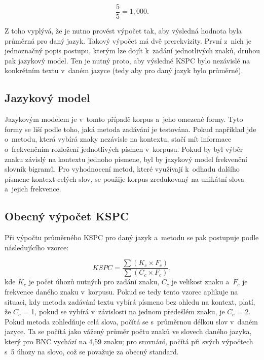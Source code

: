 \documentclass[a4paper,11pt,openany]{book} %
\begin{document}
\[
	\frac{5}{5} = 1,000.
\]

Z toho vyplývá, že je nutno provést výpočet tak, aby výsledná hodnota byla průměrná pro daný jazyk. Takový výpočet má dvě prerekvizity. První z~nich je jednoznačný popis postupu, kterým lze dojít k~zadání jednotlivých znaků, druhou pak jazykový model. Ten je nutný proto, aby výsledné KSPC bylo nezávislé na konkrétním textu v~daném jazyce (tedy aby pro daný jazyk bylo průměrné). \parencite[196]{mackenzie2002kspc}

\subsection{Jazykový model}

Jazykovým modelem je v~tomto případě korpus a~jeho omezené formy. Tyto formy se liší podle toho, jaká metoda zadávání je testována. Pokud například jde o~metodu, která vybírá znaky nezávisle na kontextu, stačí mít informace o~frekvenčním rozložení jednotlivých písmen v~korpusu. Pokud by byl výběr znaku závislý na kontextu jednoho písmene, byl by jazykový model frekvenční slovník bigramů. Pro vyhodnocení metod, které využívají k~odhadu dalšího písmene kontext celých slov, se použije korpus zredukovaný na unikátní slova a~jejich frekvence.  \parencite[197]{mackenzie2002kspc} %

\subsection{Obecný výpočet KSPC}

Při výpočtu průměrného KSPC pro daný jazyk a~metodu se pak postupuje podle následujícího vzorce:

\[
	KSPC = \frac{\sum{ (K_c \times F_c) }}{\sum{ (C_c \times F_c) }},
\]
kde $K_c$ je počet úhozů nutných pro zadání znaku, $C_c$ je velikost znaku a~$F_c$ je frekvence daného znaku v~korpusu. Pokud se tedy tento vzorec aplikuje na situaci, kdy metoda zadávání textu vybírá písmeno bez ohledu na kontext, platí, že $C_c$ = 1, pokud se vybírá v~závislosti na jednom předešlém znaku, je $C_c$ = 2. Pokud metoda zohledňuje celá slova, počítá se s~průměrnou délkou slov v~daném jazyce. Ta se počítá jako vážený průměr počtu znaků ve slovech daného jazyka, který pro BNC vychází na 4,59 znaku; pro srovnání, \parencite[2]{arif2009analysis} počítá při svých výpočtech s~5 úhozy na slovo, což se považuje za obecný standard. \parencite[3]{tarvainen2010beginner} %
\end{document}
